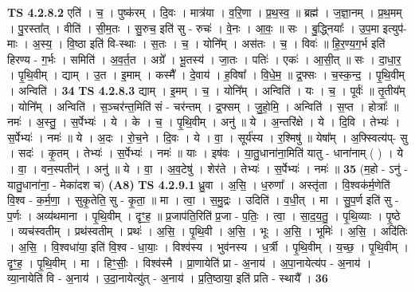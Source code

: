 \documentclass[17pt]{extarticle}
\begin{document}
                  \newline
                                \textbf{ TS 4.2.8.2} \newline
                  एति॑ । च॒ । पुष्क॑रम् । दि॒वः । मात्र॑या । व॒रि॒णा । प्र॒थ॒स्व॒ ॥ ब्रह्म॑ । ज॒ज्ञा॒नम् । प्र॒थ॒मम् । पु॒रस्ता᳚त् । वीति॑ । सी॒म॒तः । सु॒रुच॒ इति॑ सु - रुचः॑ । वे॒नः । आ॒वः॒ ॥ सः । बु॒द्ध्नियाः᳚ । उ॒प॒मा इत्युप॑-माः । अ॒स्य॒ । वि॒ष्ठा इति॑ वि-स्थाः । स॒तः । च॒ । योनि᳚म् । अस॑तः । च॒ । विवः॑ ॥ हि॒र॒ण्य॒ग॒र्भ इति॑ हिरण्य - ग॒र्भः । समिति॑ । अ॒व॒र्त॒त । अग्रे᳚ । भू॒तस्य॑ । जा॒तः । पतिः॑ । एकः॑ । आ॒सी॒त् ॥ सः । दा॒धा॒र॒ । पृ॒थि॒वीम् । द्याम् । उ॒त । इ॒माम् । कस्मै᳚ । दे॒वाय॑ । ह॒विषा᳚ । वि॒धे॒म॒ ॥ द्र॒फ्सः । च॒स्क॒न्द॒ । पृ॒थि॒वीम् । अन्विति॑ । \textbf{  34} \newline
                  \newline
                                \textbf{ TS 4.2.8.3} \newline
                  द्याम् । इ॒मम् । च॒ । योनि᳚म् । अन्विति॑ । यः । च॒ । पूर्वः॑ ॥ तृ॒तीय᳚म् । योनि᳚म् । अन्विति॑ । स॒ञ्चर॑न्त॒मिति॑ सं - चर॑न्तम् । द्र॒फ्सम् । जु॒हो॒मि॒ । अन्विति॑ । स॒प्त । होत्राः᳚ ॥ नमः॑ । अ॒स्तु॒ । स॒र्पेभ्यः॑ । ये । के । च॒ । पृ॒थि॒वीम् । अनु॑ ॥ ये । अ॒न्तरि॑क्षे । ये । दि॒वि । तेभ्यः॑ । स॒र्पेभ्यः॑ । नमः॑ ॥ ये । अ॒दः । रो॒च॒ने । दि॒वः । ये । वा॒ । सूर्य॑स्य । र॒श्मिषु॑ ॥ येषा᳚म् । अ॒फ्स्वित्य॑प्- सु । सदः॑ । कृ॒तम् । तेभ्यः॑ । स॒र्पेभ्यः॑ । नमः॑ ॥ याः । इष॑वः । या॒तु॒धाना॑ना॒मिति॑ यातु - धाना॑नाम् ( ) । ये । वा॒ । वन॒स्पतीन्॑ । अनु॑ ॥ ये । वा॒ । अ॒व॒टेषु॑ । शेर॑ते । तेभ्यः॑ । स॒र्पेभ्यः॑ । नमः॑ ॥ \textbf{  35} \newline
                  \newline
                      (म॒हो - ऽनु॑ - यातु॒धाना॑ना॒ - मेका॑दश च)  \textbf{(A8)} \newline \newline
                                \textbf{ TS 4.2.9.1} \newline
                  ध्रु॒वा । अ॒सि॒ । ध॒रुणा᳚ । अस्तृ॑ता । वि॒श्वक॑र्म॒णेति॑ वि॒श्व - क॒र्म॒णा॒ । सुकृ॒तेति॒ सु - कृ॒ता॒ ॥ मा । त्वा॒ । स॒मु॒द्रः । उदिति॑ । व॒धी॒त् । मा । सु॒प॒र्ण इति॑ सु - प॒र्णः । अव्य॑थमाना । पृ॒थि॒वीम् । दृꣳ॒॒ह॒ ॥ प्र॒जाप॑ति॒रिति॑ प्र॒जा - प॒तिः॒ । त्वा॒ । सा॒द॒य॒तु॒ । पृ॒थि॒व्याः । पृ॒ष्ठे । व्यच॑स्वतीम् । प्रथ॑स्वतीम् । प्रथः॑ । अ॒सि॒ । पृ॒थि॒वी । अ॒सि॒ । भूः । अ॒सि॒ । भूमिः॑ । अ॒सि॒ । अदि॑तिः । अ॒सि॒ । वि॒श्वधा॑या॒ इति॑ वि॒श्व - धा॒याः॒ । विश्व॑स्य । भुव॑नस्य । ध॒र्त्री । पृ॒थि॒वीम् । य॒च्छ॒ । पृ॒थि॒वीम् । दृꣳ॒॒ह॒ । पृ॒थि॒वीम् । मा । हिꣳ॒॒सीः॒ । विश्व॑स्मै । प्रा॒णायेति॑ प्रा - अ॒नाय॑ । अ॒पा॒नायेत्य॑प - अ॒नाय॑ । व्या॒नायेति॑ वि - अ॒नाय॑ । उ॒दा॒नायेत्यु॑त् - अ॒नाय॑ । प्र॒ति॒ष्ठाया॒ इति॑ प्रति - स्थायै᳚ । \textbf{  36} \newline
\end{document}
